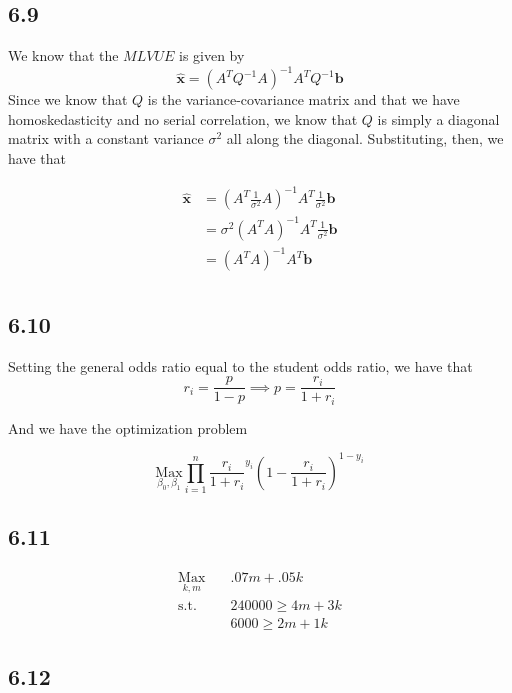 \documentclass[letterpaper,12pt]{article}
\theoremstyle{definition}
\begin{document}
\subsection*{6.9}

We know that the $MLVUE$ is given by
\[ \hat{\mathbf{x}} = (A^TQ^{-1}A)^{-1}A^TQ^{-1}\mathbf{b}\]
Since we know that $Q$ is the variance-covariance matrix and that we have homoskedasticity and no serial correlation, we know that $Q$ is simply a diagonal matrix with a constant variance $\sigma^2$ all along the diagonal. Substituting, then, we have that

\begin{align*}
\hat{\mathbf{x}} &= (A^T \frac{1}{\sigma^2}A)^{-1}A^T\frac{1}{\sigma^2}\mathbf{b}\\
&= \sigma^2(A^T A)^{-1}A^T\frac{1}{\sigma^2}\mathbf{b}\\
&= (A^T A)^{-1}A^T\mathbf{b}\\
\end{align*}

\subsection*{6.10}

Setting the general odds ratio equal to the student odds ratio, we have that
\[
r_i = \frac{p}{1-p}
\implies
p = \frac{r_i}{1+r_i}
\]

And we have the optimization problem

\[ \underset{\beta_0, \beta_1}{\text{Max}} \displaystyle\prod_{i=1}^n {\frac{r_i}{1+r_i}}^{y_i}(1-\frac{r_i}{1+r_i})^{1-y_i}  \] 

\subsection*{6.11}

\begin{align*}
\underset{k, m}{\text{Max}}\quad&.07m + .05k\\
\text{s.t.}\quad&240000 \geq 4m + 3k\\
&6000 \geq 2m + 1k
\end{align*}

\subsection*{6.12}
\end{document}
